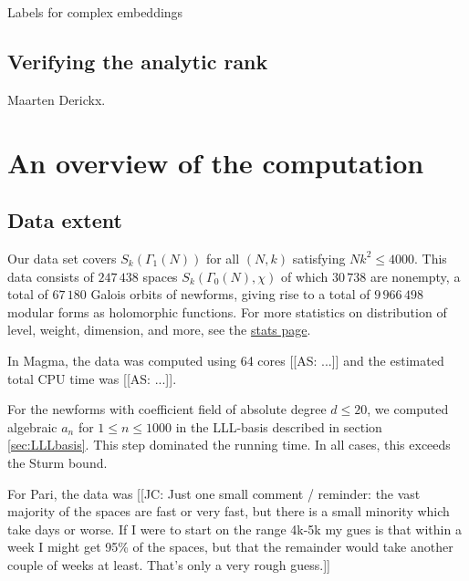 \documentclass[11pt]{amsart}
\numberwithin{equation}{subsection}
\theoremstyle{plain}
\theoremstyle{definition}
\newcommand{\as}[1]{{\color{pastelred} \textsf{[[AS: #1]]}}}
\newcommand{\jc}[1]{{\color{orange} \textsf{[[JC: #1]]}}}
\begin{document}
Labels for complex embeddings

\subsection{Verifying the analytic rank}

Maarten Derickx.

\section{An overview of the computation} \label{sec:overview}

\subsection{Data extent}

Our data set covers $S_k(\Gamma_1(N))$ for all $(N,k)$ satisfying $Nk^2 \leq 4000$.  This data consists of $247\,438$ spaces $S_k(\Gamma_0(N),\chi)$ of which $30\,738$ are nonempty, a total of $67\,180$ Galois orbits of newforms, giving rise to a total of $9\,966\,498$ modular forms as holomorphic functions.  For more statistics on distribution of level, weight, dimension, and more, see the \href{http://cmfs.lmfdb.xyz/ModularForm/GL2/Q/holomorphic/stats}{stats page}.

In Magma, the data was computed using 64 cores \as{...} and the estimated total CPU time was \as{...}.  

For the newforms with coefficient field of absolute degree $d \leq 20$, we computed algebraic $a_n$ for $1 \leq n \leq 1000$ in the LLL-basis described in section \ref{sec:LLLbasis}.  This step dominated the running time.  In all cases, this exceeds the Sturm bound.

For Pari, the data was \jc{Just one small comment / reminder: the vast majority of the spaces are fast or very fast, but there is a small minority which take days or worse.  If I were to start on the range 4k-5k my gues is that within a week I might get 95\% of the spaces, but that the remainder would take another couple of weeks at least.  That's only a very rough guess.}
\end{document}
